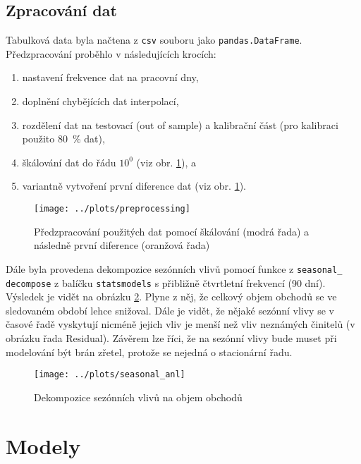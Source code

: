 \documentclass[a4paper,12pt, czech]{article}
\newcommand{\code}[1]{\texttt{#1}}
\begin{document}
\subsection{Zpracování dat}

Tabulková data byla načtena z \code{csv} souboru jako \code{pandas.DataFrame}.
Předzpracování proběhlo v následujících krocích:

\begin{enumerate}
	\item nastavení frekvence dat na pracovní dny,
	\item doplnění chybějících dat interpolací,
	\item rozdělení dat na testovací (out of sample) a kalibrační část (pro kalibraci použito \SI{80}{\percent} dat),
	\item škálování dat do řádu $\num{10}^0$ (viz obr. \ref{fig:preprocess}), a
	\item variantně vytvoření první diference dat (viz obr. \ref{fig:preprocess}).
\end{enumerate}

\begin{figure}[htbp]
	\centering
	\texttt{[image: ../plots/preprocessing]}
	\caption{Předzpracování použitých dat pomocí škálování (modrá řada) a následně první diference (oranžová řada)}
	\label{fig:preprocess}
\end{figure}

Dále byla provedena dekompozice sezónních vlivů pomocí funkce z \code{seasonal\_} \code{decompose} z balíčku \code{statsmodels} s přibližně čtvrtletní frekvencí (90 dní).
Výsledek je vidět na obrázku \ref{fig:seasonal_anl}.
Plyne z něj, že celkový objem obchodů se ve sledovaném období lehce snižoval.
Dále je vidět, že nějaké sezónní vlivy se v časové řadě vyskytují nicméně jejich vliv je menší než vliv neznámých činitelů (v obrázku řada Residual).
Závěrem lze říci, že na sezónní vlivy bude muset při modelování být brán zřetel, protože se nejedná o stacionární řadu.

\begin{figure}[htbp]
	\centering
	\texttt{[image: ../plots/seasonal\_anl]}
	\caption{Dekompozice sezónních vlivů na objem obchodů}
	\label{fig:seasonal_anl}
\end{figure}


\section{Modely}
\end{document}
